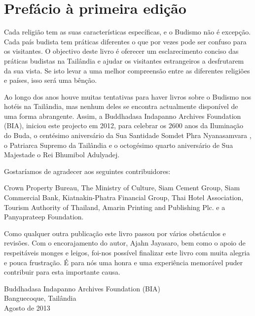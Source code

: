 \clearpage
\chapter{Prefácio à primeira edição}

{\fontsize{10.5}{13.5}\selectfont

Cada religião tem as suas características específicas, e o Budismo não é
excepção. Cada país budista tem práticas diferentes o que por vezes pode ser
confuso para os visitantes. O objectivo deste livro é oferecer um esclarecimento
conciso das práticas budistas na Tailândia e ajudar os visitantes estrangeiros a
desfrutarem da sua vista. Se isto levar a uma melhor compreensão entre as
diferentes religiões e países, isso será uma bênção.

Ao longo dos anos houve muitas tentativas para haver livros sobre o Budismo nos
hotéis na Tailândia, mas nenhum deles se encontra actualmente disponível de uma
forma abrangente. Assim, a Buddhadasa Indapanno Archives Foundation (BIA),
iniciou este projecto em 2012, para celebrar os 2600 anos da Iluminação do Buda,
o centésimo aniversário da Sua Santidade Somdet Phra Nyanasamvara , o Patriarca
Supremo da Tailândia e o octogésimo quarto aniversário de Sua Majestade o Rei
Bhumibol Adulyadej.

Gostaríamos de agradecer aos seguintes contribuidores:

Crown Property Bureau, The Ministry of Culture, Siam Cement Group, Siam
Commercial Bank, Kiatnakin-Phatra Financial Group, Thai Hotel Association,
Tourism Authority of Thailand, Amarin Printing and Publishing Plc. e a
Panyaprateep Foundation.

Como qualquer outra publicação este livro passou por vários obstáculos e
revisões. Com o encorajamento do autor, Ajahn Jayasaro, bem como o apoio de
respeitáveis monges e leigos, foi-nos possível finalizar este livro com muita
alegria e pouca frustração. É para nós uma honra e uma experiência memorável
puder contribuir para esta importante causa.

{\raggedleft
  Buddhadasa Indapanno Archives Foundation (BIA)\\
  Banguecoque, Tailândia\\
  Agosto de 2013
\par}

}

